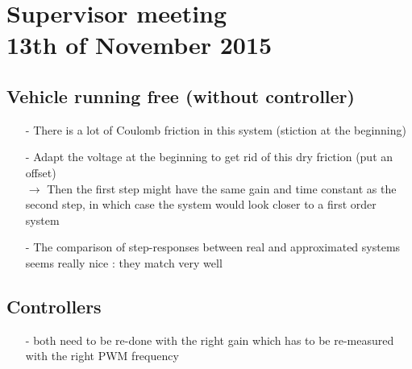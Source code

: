 

\renewcommand\chaptername{KAPITEL}
\renewcommand\contentsname{Indhold}
\renewcommand\figurename{Figur}
\renewcommand\tablename{Tabel}

\section*{Supervisor meeting\\ \small 13th of November 2015}
\subsection{Vehicle running free (without controller)}
\begin{itemize}
\item[-] There is a lot of Coulomb friction in this system (stiction at the beginning)
\item[-] Adapt the voltage at the beginning to get rid of this dry friction (put an offset) \\
$\rightarrow$ Then the first step might have the same gain and time constant as the second step, in which case the system would look closer to a first order system
\item[-] The comparison of step-responses between real and approximated systems seems really nice : they match very well
\end{itemize}

\subsection{Controllers}
\begin{itemize}
\item[-] both need to be re-done with the right gain which has to be re-measured with the right PWM frequency
\end{itemize}

